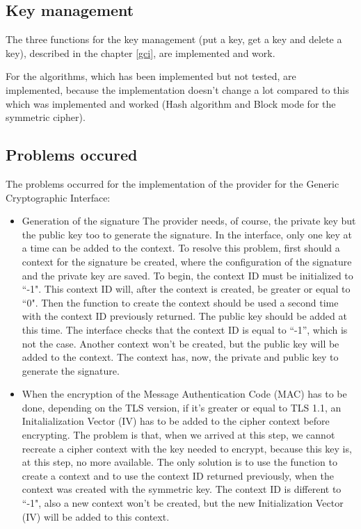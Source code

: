 \subsection*{Key management}
The three functions for the key management (put a key, get a key and delete a
key), described in the chapter \ref{gci}, are implemented and work.


For the algorithms, which has been implemented but not tested, are implemented,
because the implementation doesn't change a lot compared to this which was
implemented and worked (Hash algorithm and Block mode for the symmetric cipher).

\subsection*{Problems occured}

The problems occurred for the implementation of the \tomcrypt provider for the
Generic Cryptographic Interface:

\begin{itemize}
  \item Generation of the signature\newline
  The provider needs, of course, the private key but the public key too to
  generate the signature. In the interface, only one key at a time can be added
  to the context.
  To resolve this problem, first should a context for the
  signature be created, where the configuration of the signature and the private
  key are saved. To begin, the context ID must be initialized to ``-1". This
  context ID will, after the context is created, be greater or equal to ``0".
  Then the function to create the context should be used a second time with the context
  ID previously returned. The public key should be added at this time. The
  interface checks that the context ID is equal to ``-1'', which is not the
  case. Another context won't be created, but the public key will be added to
  the context. The context has, now, the private and public key to generate
  the signature.
  \item When the encryption of the Message Authentication Code (MAC) has to be
  done, depending on the TLS version, if it's greater or equal to TLS 1.1, an
  Initalialization Vector (IV) has to be added to the cipher context before
  encrypting.
  The problem is that, when we arrived at this step, we cannot recreate a cipher
  context with the key needed to encrypt, because this key is, at this step,
  no more available. The only solution is to use the function to create a
  context and to use the context ID returned previously, when the context was
  created with the symmetric key. The context ID is different to ``-1", also a
  new context won't be created, but the new Initialization Vector (IV)
  \cite{wiki:iv} will be added to this context.
\end{itemize}